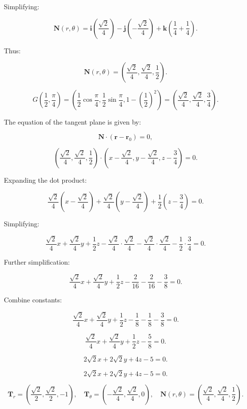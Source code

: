 \documentclass[hidelinks]{article}
\begin{document}
Simplifying:

\[
\mathbf{N}(r, \theta) = \mathbf{i} \left( \frac{\sqrt{2}}{4} \right) - \mathbf{j} \left( -\frac{\sqrt{2}}{4} \right) + \mathbf{k} \left( \frac{1}{4} + \frac{1}{4} \right).
\]

Thus:

\[
\mathbf{N}(r, \theta) = \left( \frac{\sqrt{2}}{4}, \frac{\sqrt{2}}{4}, \frac{1}{2} \right).
\]


\[
G\left( \frac{1}{2}, \frac{\pi}{4} \right) = \left( \frac{1}{2} \cos \frac{\pi}{4}, \frac{1}{2} \sin \frac{\pi}{4}, 1 - \left( \frac{1}{2} \right)^2 \right) = \left( \frac{\sqrt{2}}{4}, \frac{\sqrt{2}}{4}, \frac{3}{4} \right).
\]

The equation of the tangent plane is given by:

\[
\mathbf{N} \cdot ( \mathbf{r} - \mathbf{r}_0 ) = 0,
\]


\[
\left( \frac{\sqrt{2}}{4}, \frac{\sqrt{2}}{4}, \frac{1}{2} \right) \cdot \left( x - \frac{\sqrt{2}}{4}, y - \frac{\sqrt{2}}{4}, z - \frac{3}{4} \right) = 0.
\]

Expanding the dot product:

\[
\frac{\sqrt{2}}{4} \left( x - \frac{\sqrt{2}}{4} \right) + \frac{\sqrt{2}}{4} \left( y - \frac{\sqrt{2}}{4} \right) + \frac{1}{2} \left( z - \frac{3}{4} \right) = 0.
\]

Simplifying:

\[
\frac{\sqrt{2}}{4} x + \frac{\sqrt{2}}{4} y + \frac{1}{2} z - \frac{\sqrt{2}}{4} \cdot \frac{\sqrt{2}}{4} - \frac{\sqrt{2}}{4} \cdot \frac{\sqrt{2}}{4} - \frac{1}{2} \cdot \frac{3}{4} = 0.
\]

Further simplification:

\[
\frac{\sqrt{2}}{4} x + \frac{\sqrt{2}}{4} y + \frac{1}{2} z - \frac{2}{16} - \frac{2}{16} - \frac{3}{8} = 0.
\]

Combine constants:

\[
\frac{\sqrt{2}}{4} x + \frac{\sqrt{2}}{4} y + \frac{1}{2} z - \frac{1}{8} - \frac{1}{8} - \frac{3}{8} = 0.
\]

\[
\frac{\sqrt{2}}{4} x + \frac{\sqrt{2}}{4} y + \frac{1}{2} z - \frac{5}{8} = 0.
\]

\[
2\sqrt{2} x + 2\sqrt{2} y + 4 z - 5 = 0.
\]


\[
2\sqrt{2} x + 2\sqrt{2} y + 4 z - 5 = 0.
\]


\[
\mathbf{T}_r = \left( \frac{\sqrt{2}}{2}, \frac{\sqrt{2}}{2}, -1 \right), \quad \mathbf{T}_\theta = \left( -\frac{\sqrt{2}}{4}, \frac{\sqrt{2}}{4}, 0 \right), \quad \mathbf{N}(r, \theta) = \left( \frac{\sqrt{2}}{4}, \frac{\sqrt{2}}{4}, \frac{1}{2} \right).
\]
\end{document}
